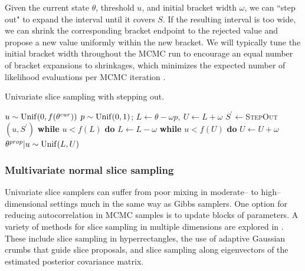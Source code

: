 Given the current state $ \theta $, threshold $ u $, and initial bracket width $ \omega $, we can ``step out" to expand the interval until it covers $ S $. If the resulting interval is too wide, we can shrink the corresponding bracket endpoint to the rejected value and propose a new value uniformly within the new bracket. We will typically tune the initial bracket width throughout the MCMC run to encourage an equal number of bracket expansions to shrinkages, which minimizes the expected number of likelihood evaluations per MCMC iteration \cite{tibbits2014automated}.

\begin{algorithm}[htbp]
	\caption{Univariate slice sampling with stepping out.}\label{alg:univar_slice}
	\begin{algorithmic}[1]
		\State $ u \sim \mathrm{Unif}(0,f(\theta^{cur})) $
		\State $ p\sim \mathrm{Unif}(0,1) $; $ L \gets \theta - \omega p,\ U \gets L+\omega $ 
		\State $ S^\prime \gets $\textsc{StepOut}$ (u,S^\prime) $ 
		\State\hspace{\algorithmicindent}\textbf{while }{$ u<f(L) $} \textbf{do} $ L \gets L-\omega $
		\State\hspace{\algorithmicindent}\textbf{while }{$u<f(U)$} \textbf{do} $ U \gets U+\omega $
		\State $ \theta^{prop}|u\sim\mathrm{Unif}(L,U) $ 
		\State\Return{$ \new{\theta} $}
		\Else{}
		\EndIf 	
		\EndIf
		\EndProcedure
	\end{algorithmic}
\end{algorithm}

\subsubsection{Multivariate normal slice sampling}
\label{subsubsec:mvn_slice_sampling}

Univariate slice samplers can suffer from poor mixing in moderate-- to high--dimensional settings much in the same way as Gibbs samplers. One option for reducing autocorrelation in MCMC samples is to update blocks of parameters. A variety of methods for slice sampling in multiple dimensions are explored in \cite{neal2003slice,thompson2011slice,tibbits2014automated}. These include slice sampling in hyperrectangles, the use of adaptive Gaussian crumbs that guide slice proposals, and slice sampling along eigenvectors of the estimated posterior covariance matrix. 

